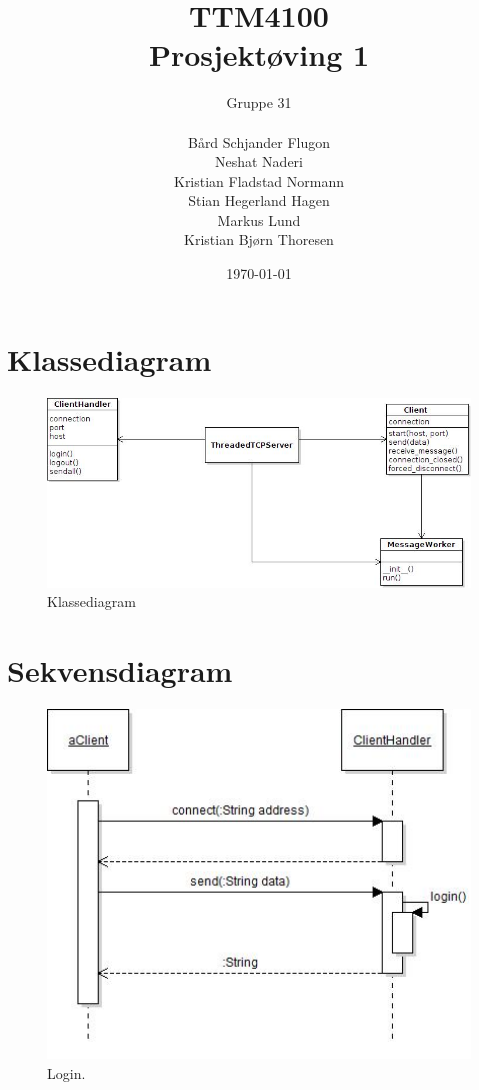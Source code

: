 \documentclass[a4paper]{article}
\title{TTM4100 \\ Prosjektøving 1}
\author{Gruppe 31 \\\\ Bård Schjander Flugon \\ Neshat Naderi \\ Kristian Fladstad Normann \\ Stian Hegerland Hagen \\ Markus Lund \\ Kristian Bjørn Thoresen}
\date{\today}
\begin{document}
\maketitle
\clearpage

\section*{Klassediagram}
\label {sec:class}

\begin{figure}[ht]
\centering
\includegraphics[width=1\textwidth]{resources/classDiag.jpg}
\caption{\label{fig:classDiag}Klassediagram}
\end{figure}

\clearpage

\section*{Sekvensdiagram}
\label{sec:sek}

\begin{figure}[ht]
\centering
\includegraphics[width=1\textwidth]{resources/loginSeq.jpg}
\caption{\label{fig:loginSeq}Login.}
\end{figure}
\end{document}
